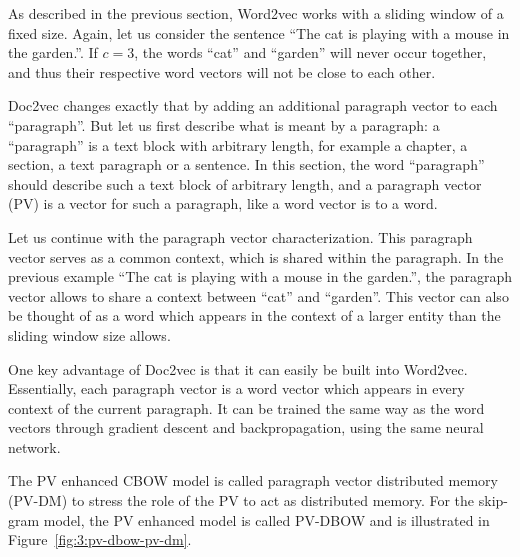 As described in the previous section, Word2vec works with a sliding window of a fixed size. Again, let us consider the sentence ``The cat is playing with a mouse in the garden.''. If $c=3$, the words ``cat'' and ``garden'' will never occur together, and thus their respective word vectors will not be close to each other.

Doc2vec changes exactly that by adding an additional paragraph vector to each ``paragraph''. But let us first describe what is meant by a paragraph: a ``paragraph'' is a text block with arbitrary length, for example a chapter, a section, a text paragraph or a sentence. In this section, the word ``paragraph'' should describe such a text block of arbitrary length, and a paragraph vector (PV) is a vector for such a paragraph, like a word vector is to a word.

Let us continue with the paragraph vector characterization. This paragraph vector serves as a common context, which is shared within the paragraph. In the previous example ``The cat is playing with a mouse in the garden.'', the paragraph vector allows to share a context between ``cat'' and ``garden''. This vector can also be thought of as a word which appears in the context of a larger entity than the sliding window size allows.

One key advantage of Doc2vec is that it can easily be built into Word2vec. Essentially, each paragraph vector is a word vector which appears in every context of the current paragraph. It can be trained the same way as the word vectors through gradient descent and backpropagation, using the same neural network.

The PV enhanced CBOW model is called paragraph vector distributed memory (PV-DM) to stress the role of the PV to act as distributed memory. For the skip-gram model, the PV enhanced model is called PV-DBOW and is illustrated in Figure~\ref{fig:3:pv-dbow-pv-dm}.


